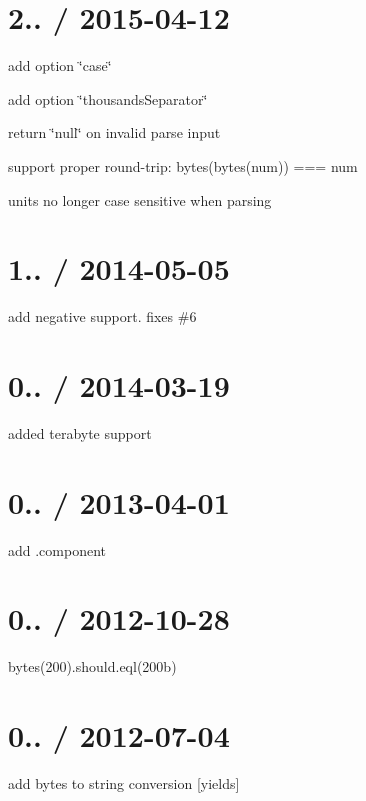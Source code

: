 \section*{2.. / 2015-\/04-\/12 }


\begin{DoxyItemize}
\item add option \char`\"{}case\char`\"{}
\item add option \char`\"{}thousands\+Separator\char`\"{}
\item return \char`\"{}null\char`\"{} on invalid parse input
\item support proper round-\/trip\+: bytes(bytes(num)) === num
\item units no longer case sensitive when parsing
\end{DoxyItemize}

\section*{1.. / 2014-\/05-\/05 }


\begin{DoxyItemize}
\item add negative support. fixes \#6
\end{DoxyItemize}

\section*{0.. / 2014-\/03-\/19 }


\begin{DoxyItemize}
\item added terabyte support
\end{DoxyItemize}

\section*{0.. / 2013-\/04-\/01 }


\begin{DoxyItemize}
\item add .component
\end{DoxyItemize}

\section*{0.. / 2012-\/10-\/28 }


\begin{DoxyItemize}
\item bytes(200).should.\+eql(\textquotesingle{}200b\textquotesingle{})
\end{DoxyItemize}

\section*{0.. / 2012-\/07-\/04 }


\begin{DoxyItemize}
\item add bytes to string conversion \mbox{[}yields\mbox{]} 
\end{DoxyItemize}